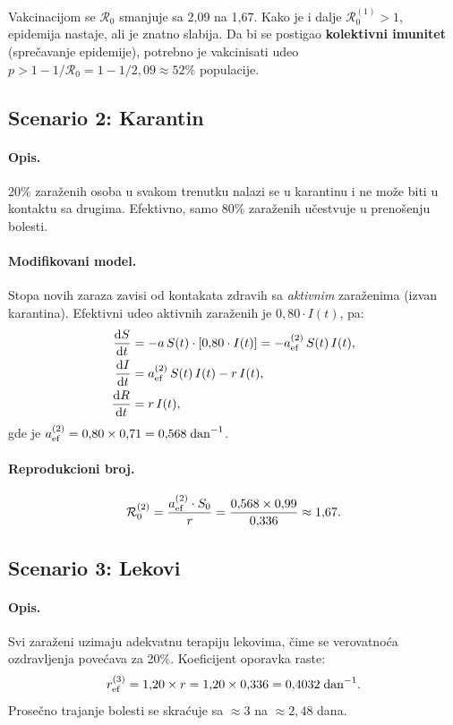 \documentclass[12pt,a4paper]{article}
\begin{document}
	Vakcinacijom se $\mathcal{R}_0$ smanjuje sa 2,09 na 1,67. Kako je i dalje $\mathcal{R}_0^{(1)}>1$,
	epidemija nastaje, ali je znatno slabija. Da bi se postigao \textbf{kolektivni imunitet}
	(sprečavanje epidemije), potrebno je vakcinisati udeo
	$p>1-1/\mathcal{R}_0=1-1/2{,}09\approx 52\%$ populacije.
	
	\subsection{Scenario 2: Karantin}
	
	\paragraph{Opis.}
	20\% zaraženih osoba u svakom trenutku nalazi se u karantinu i ne može biti u kontaktu sa
	drugima. Efektivno, samo 80\% zaraženih učestvuje u prenošenju bolesti.
	
	\paragraph{Modifikovani model.}
	Stopa novih zaraza zavisi od kontakata zdravih sa \textit{aktivnim} zaraženima (izvan
	karantina). Efektivni udeo aktivnih zaraženih je $0{,}80\cdot I(t)$, pa:
	\begin{align}
		\frac{\mathrm{d}S}{\mathrm{d}t} &= -a\,S(t)\cdot[0{,}80\cdot I(t)]
		= -a_{\rm ef}^{(2)}\,S(t)\,I(t), \\
		\frac{\mathrm{d}I}{\mathrm{d}t} &= a_{\rm ef}^{(2)}\,S(t)\,I(t) - r\,I(t), \\
		\frac{\mathrm{d}R}{\mathrm{d}t} &= r\,I(t),
	\end{align}
	gde je $a_{\rm ef}^{(2)} = 0{,}80\times 0{,}71 = 0{,}568\;\mathrm{dan}^{-1}$.
	
	\paragraph{Reprodukcioni broj.}
	\begin{equation}
		\mathcal{R}_0^{(2)} = \frac{a_{\rm ef}^{(2)}\cdot S_0}{r}
		= \frac{0{,}568\times 0{,}99}{0{,}336} \approx 1{,}67.
	\end{equation}
	
	\subsection{Scenario 3: Lekovi}
	
	\paragraph{Opis.}
	Svi zaraženi uzimaju adekvatnu terapiju lekovima, čime se verovatnoća ozdravljenja
	povećava za 20\%. Koeficijent oporavka raste:
	\begin{equation}
		r_{\rm ef}^{(3)} = 1{,}20\times r = 1{,}20\times 0{,}336 = 0{,}4032\;\mathrm{dan}^{-1}.
	\end{equation}
	Prosečno trajanje bolesti se skraćuje sa $\approx 3$ na $\approx 2{,}48$ dana.
	
\end{document}
